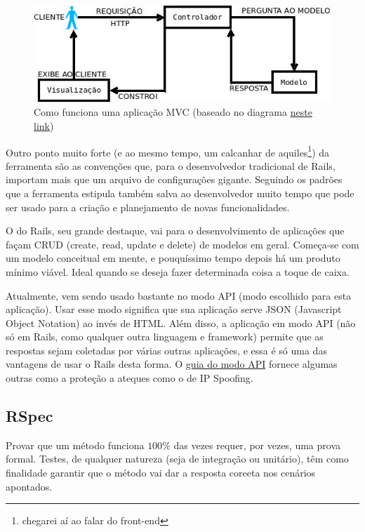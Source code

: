 \begin{figure}[htb]
    \centering
    \includegraphics[width=.7\textwidth]{figuras/mvc.jpeg}
    \caption{Como funciona uma aplicação MVC (baseado no diagrama \href{https://blog.cloudboost.io/what-is-model-view-controller-124a9942246}{neste link})}
    \label{fig:mvc}
\end{figure}

Outro ponto muito forte (e ao mesmo tempo, um calcanhar de aquiles\footnote{chegarei aí ao falar
do front-end}) da ferramenta são as convenções que, para o desenvolvedor tradicional de Rails,
importam mais que um arquivo de configurações gigante. Seguindo os padrões que a ferramenta estipula
também salva ao desenvolvedor muito tempo que pode ser usado para a criação e planejamento de novas
funcionalidades.

O  do Rails, seu grande destaque, vai para o desenvolvimento de aplicações que façam
CRUD (create, read, update e delete) de modelos em geral. Começa-se com um modelo conceitual em mente,
e pouquíssimo tempo depois há um produto mínimo viável. Ideal quando se deseja fazer determinada coisa
a toque de caixa.

Atualmente, vem sendo usado bastante no modo API (modo escolhido para esta aplicação). Usar esse
modo significa que sua aplicação serve JSON (Javascript Object Notation) ao invés de HTML. Além
disso, a aplicação em modo API (não só em Rails, como qualquer outra linguagem e framework) permite
que as respostas sejam coletadas por várias outras aplicações, e essa é só uma das vantagens de usar
o Rails desta forma. O \href{https://edgeguides.rubyonrails.org/api_app.html}{guia do modo API}
fornece algumas outras como a proteção a ateques como o de IP Spoofing.

\subsection{RSpec}
\label{subsec:rspec}

Provar que um método funciona $100\%$ das vezes requer, por vezes, uma prova
formal. Testes, de qualquer natureza (seja de integração ou unitário), têm como
finalidade garantir que o método vai dar a resposta coreeta nos cenários apontados.

